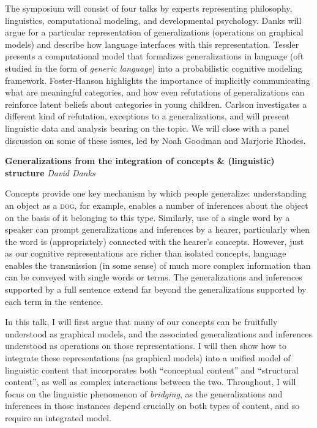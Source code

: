 \documentclass[10pt,letterpaper]{article}
\begin{document}
The symposium will consist of four talks by experts representing philosophy, linguistics, computational modeling, and developmental psychology.    
Danks will argue for a particular representation of generalizations (operations on graphical models) and describe how language interfaces with this representation.
 Tessler presents a computational model that formalizes generalizations in language (oft studied in the form of \emph{generic language}) into a probabilistic cognitive modeling framework.
 Foster-Hanson highlights the importance of implicitly communicating what are meaningful categories, and how even refutations of generalizations can reinforce latent beliefs about categories in young children.
 Carlson investigates a different kind of refutation, exceptions to a generalizations, and will present linguistic data and analysis bearing on the topic.
We will close with a panel discussion on some of these issues, led by Noah Goodman and Marjorie Rhodes.



\noindent\textbf{Generalizations from the integration of concepts \& (linguistic) structure} 
\noindent\emph{David Danks}

Concepts provide one key mechanism by which people generalize: understanding an object as a \textsc{dog}, for example, enables a number of inferences about the object on the basis of it belonging to this type. 
Similarly, use of a single word by a speaker can prompt generalizations and inferences by a hearer, particularly when the word is (appropriately) connected with the hearer's concepts. 
However, just as our cognitive representations are richer than isolated concepts, language enables the transmission (in some sense) of much more complex information than can be conveyed with single words or terms. 
The generalizations and inferences supported by a full sentence extend far beyond the generalizations supported by each term in the sentence. 

In this talk, I will first argue that many of our concepts can be fruitfully understood as graphical models, and the associated generalizations and inferences understood as operations on those representations. 
I will then show how to integrate these representations (as graphical models) into a unified model of linguistic content that incorporates both ``conceptual content'' and ``structural content'', as well as complex interactions between the two. 
Throughout, I will focus on the linguistic phenomenon of \emph{bridging}, as the generalizations and inferences in those instances depend crucially on both types of content, and so require an integrated model.
\end{document}
